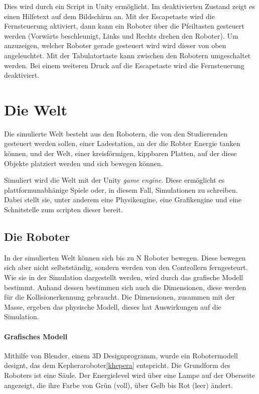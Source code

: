 Dies wird durch ein Script in Unity erm{\"{o}}glicht. Im deaktivierten Zustand zeigt es einen Hilfetext auf dem Bildschirm an. Mit der Escapetaste wird die Fernsteuerung aktiviert, dann kann ein
Roboter {\"{u}}ber die Pfeiltasten gesteuert werden (Vorw{\"{a}}rts beschleunigt, Links und Rechts drehen den Roboter).
Um anzuzeigen, welcher Roboter gerade gesteuert wird wird dieser von oben angeleuchtet. Mit der Tabulatortaste kann zwischen den
Robotern umgeschaltet werden. Bei einem weiteren Druck auf die Escapetaste wird die Fernsteuerung deaktiviert.


\clearpage
\section{Die Welt}
Die simulierte Welt besteht aus den Robotern, die von den Studierenden gesteuert werden sollen, einer Ladestation, an der die Robter Energie tanken k{\"{o}}nnen, und
der Welt, einer kreisf{\"{o}}rmigen, kippbaren Platten, auf der diese Objekte platziert werden und sich bewegen k{\"{o}}nnen.

Simuliert wird die Welt mit der Unity \textit{game engine}. Diese erm{\"{o}}glicht es plattformunabh{\"{a}}nige Spiele oder, in diesem Fall, Simulationen zu schreiben.
Dabei stellt sie, unter anderem eine Physikengine, eine Grafikengine und eine Schnitstelle zum scripten dieser bereit. 

\subsection{Die Roboter}\label{robot}
In der simulierten Welt k{\"{o}}nnen sich bis zu \gls{N} Roboter bewegen. Diese bewegen sich aber nicht selbstst{\"{a}}ndig, sondern werden von den Controllern ferngesteurt.
Wie sie in der Simulation dargestellt werden, wird durch das grafische Modell bestimmt. Anhand dessen bestimmen sich auch die Dimensionen, diese werden f{\"{u}}r die Kollisionerkennung
gebraucht. Die Dimensionen, zusammen mit der Masse, ergeben das physische Modell, dieses hat Auswirkungen auf die Simulation.

\paragraph{Grafisches Modell} Mithilfe von Blender, einem 3D Designprogramm, wurde ein Robotermodell designt, das dem Kepheraroboter\ref{khepera} entspricht. Die Grundform des Roboters ist
eine S{\"{a}}ule.
Der Energielevel wird {\"{u}}ber eine Lampe auf der Oberseite angezeigt, die ihre
Farbe von Gr{\"{u}}n (voll), {\"{u}}ber Gelb bis Rot (leer) {\"{a}}ndert.


